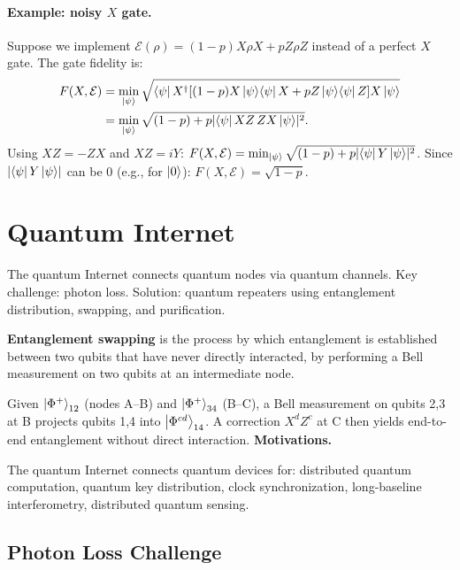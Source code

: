 \documentclass[10pt,a4paper]{article}
\begin{document}
\paragraph{Example: noisy $X$ gate.} Suppose we implement $\mathcal{E}(\rho)=(1-p)X\rho X+pZ\rho Z$ instead of a perfect $X$ gate. The gate fidelity is:
\begin{align*}
F(X,\mathcal{E})&=\min_{\ket{\psi}}\sqrt{\bra{\psi}X^\dagger[(1-p)X\ket{\psi}\!\bra{\psi}X+pZ\ket{\psi}\!\bra{\psi}Z]X\ket{\psi}}\\
&=\min_{\ket{\psi}}\sqrt{(1-p)+p|\!\bra{\psi}XZ\,ZX\ket{\psi}\!|^2}.
\end{align*}
Using $XZ=-ZX$ and $XZ=iY$: $F(X,\mathcal{E})=\min_{\ket{\psi}}\sqrt{(1-p)+p|\!\bra{\psi}Y\ket{\psi}\!|^2}$. Since $|\!\bra{\psi}Y\ket{\psi}\!|$ can be 0 (e.g., for $\ket{0}$): $F(X,\mathcal{E})=\sqrt{1-p}$.

\newpage
\section{Quantum Internet}

The quantum Internet connects quantum nodes via quantum channels. Key challenge: photon loss. Solution: quantum repeaters using entanglement distribution, swapping, and purification.

\begin{tcolorbox}[defstyle, title={Definition}]
\textbf{Entanglement swapping} is the process by which entanglement is established between two qubits that have never directly interacted, by performing a Bell measurement on two qubits at an intermediate node.
\end{tcolorbox}
Given $\ket{\Phi^+}_{12}$ (nodes A--B) and $\ket{\Phi^+}_{34}$ (B--C), a Bell measurement on qubits 2,3 at B projects qubits 1,4 into $\ket{\Phi^{cd}}_{14}$. A correction $X^d Z^c$ at C then yields end-to-end entanglement without direct interaction.
\textbf{Motivations.}

The quantum Internet connects quantum devices for: distributed quantum computation, quantum key distribution, clock synchronization, long-baseline interferometry, distributed quantum sensing.

\subsection{Photon Loss Challenge}
\end{document}
